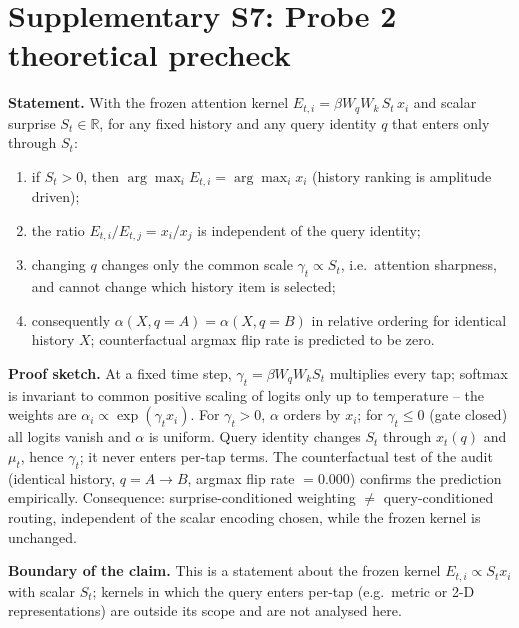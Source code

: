 \section{Supplementary S7: Probe 2 theoretical precheck}

\textbf{Statement.} With the frozen attention kernel
$E_{t,i} = \beta W_q W_k\, S_t\, x_i$ and scalar surprise
$S_t \in \mathbb{R}$, for any fixed history and any query identity $q$
that enters only through $S_t$:

\begin{enumerate}
  \item if $S_t > 0$, then
    $\arg\max_i E_{t,i} = \arg\max_i x_i$ (history ranking is amplitude
    driven);
  \item the ratio $E_{t,i}/E_{t,j} = x_i/x_j$ is independent of the
    query identity;
  \item changing $q$ changes only the common scale $\gamma_t \propto
    S_t$, i.e.\ attention sharpness, and cannot change which history
    item is selected;
  \item consequently $\alpha(X,q{=}A) = \alpha(X,q{=}B)$ in relative
    ordering for identical history $X$; counterfactual argmax flip rate
    is predicted to be zero.
\end{enumerate}

\textbf{Proof sketch.} At a fixed time step, $\gamma_t = \beta W_q W_k
S_t$ multiplies every tap; softmax is invariant to common positive
scaling of logits only up to temperature -- the weights are
$\alpha_i \propto \exp(\gamma_t x_i)$.  For $\gamma_t > 0$, $\alpha$
orders by $x_i$; for $\gamma_t \leq 0$ (gate closed) all logits vanish
and $\alpha$ is uniform.  Query identity changes $S_t$ through
$x_t(q)$ and $\mu_t$, hence $\gamma_t$; it never enters per-tap terms.
The counterfactual test of the audit (identical history, $q = A \to B$,
argmax flip rate $= 0.000$) confirms the prediction empirically.
Consequence: surprise-conditioned weighting
$\neq$ query-conditioned routing, independent of the scalar encoding
chosen, while the frozen kernel is unchanged.

\textbf{Boundary of the claim.} This is a statement about the frozen
kernel $E_{t,i} \propto S_t x_i$ with scalar $S_t$; kernels in which the
query enters per-tap (e.g.\ metric or 2-D representations) are outside
its scope and are not analysed here.

